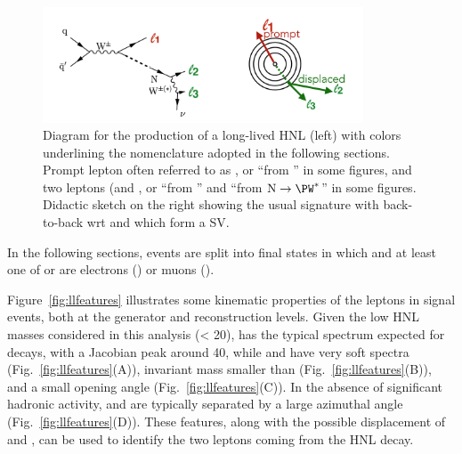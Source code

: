 \begin{figure}[h]
\centering
\includegraphics[width=0.85\textwidth]{Figures/c6/llsketch}
\caption{Diagram for the production of a long-lived HNL (left) with colors
  underlining the nomenclature adopted in the following
  sections. Prompt lepton often referred to as \lone, or ``\lept from
  \PW'' in some figures, and two \displ leptons (\ltwo and \lthree, or
``\lept from \hnl'' and ``\lept from $\hnl\to\PW^\ast$'' in some
figures. Didactic sketch on the right showing the usual signature with
 \lone back-to-back wrt \ltwo and \lthree which form a SV.}
\label{fig:c6llsketch}
\end{figure}

In the following sections, events are split into  
final states in which \lone and at least one of \ltwo or \lthree are
electrons (\eex) or muons (\mmx).

Figure~\ref{fig:llfeatures} illustrates some
kinematic properties of the leptons in signal events, both at the
generator and reconstruction levels.
Given the low HNL masses considered in this analysis (\mhnl < 20\GeV),
\lone has the typical \pt spectrum expected for \PW decays, with a
Jacobian peak around 40\GeV,
while \ltwo and \lthree have very soft \pt spectra (Fig.~\ref{fig:llfeatures}(A)), invariant mass smaller than \mhnl (Fig.~\ref{fig:llfeatures}(B)), and a small opening angle
(Fig.~\ref{fig:llfeatures}(C)).
In the absence of significant hadronic activity, \lone and \hnl are
typically separated by a large azimuthal angle (Fig.~\ref{fig:llfeatures}(D)).
These features, along with the possible displacement of \ltwo and
\lthree, can be used to identify the two leptons coming from the HNL
decay.

